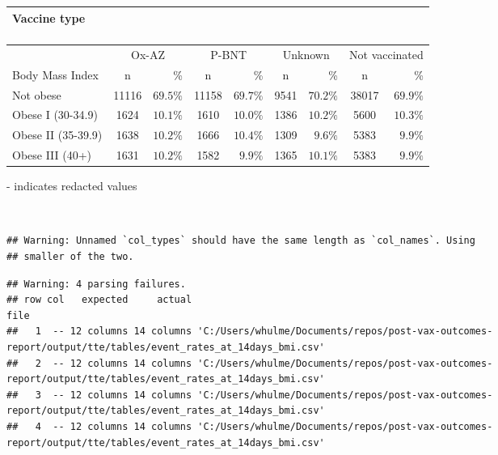 \documentclass[
]{article}
\begin{document}
\captionsetup[table]{labelformat=empty,skip=1pt}
\begin{longtable}{lcrcrcrcr}
\caption*{
\large Vaccine type\\ 
\small \\ 
} \\ 
\toprule
& \multicolumn{2}{c}{Ox-AZ} & \multicolumn{2}{c}{P-BNT} & \multicolumn{2}{c}{Unknown} & \multicolumn{2}{c}{Not vaccinated} \\ 
 \cmidrule(lr){2-3}\cmidrule(lr){4-5}\cmidrule(lr){6-7}\cmidrule(lr){8-9}
Body Mass Index & n & \% & n & \% & n & \% & n & \% \\ 
\midrule
Not obese & 11116 & $69.5\%$ & 11158 & $69.7\%$ & 9541 & $70.2\%$ & 38017 & $69.9\%$ \\ 
Obese I (30-34.9) & 1624 & $10.1\%$ & 1610 & $10.0\%$ & 1386 & $10.2\%$ & 5600 & $10.3\%$ \\ 
Obese II (35-39.9) & 1638 & $10.2\%$ & 1666 & $10.4\%$ & 1309 & $9.6\%$ & 5383 & $9.9\%$ \\ 
Obese III (40+) & 1631 & $10.2\%$ & 1582 & $9.9\%$ & 1365 & $10.1\%$ & 5383 & $9.9\%$ \\ 
\bottomrule
\end{longtable}
\begin{minipage}{\linewidth}
- indicates redacted values\\ 
\end{minipage}

~ ~

\begin{verbatim}
## Warning: Unnamed `col_types` should have the same length as `col_names`. Using
## smaller of the two.
\end{verbatim}

\begin{verbatim}
## Warning: 4 parsing failures.
## row col   expected     actual                                                                                                       file
##   1  -- 12 columns 14 columns 'C:/Users/whulme/Documents/repos/post-vax-outcomes-report/output/tte/tables/event_rates_at_14days_bmi.csv'
##   2  -- 12 columns 14 columns 'C:/Users/whulme/Documents/repos/post-vax-outcomes-report/output/tte/tables/event_rates_at_14days_bmi.csv'
##   3  -- 12 columns 14 columns 'C:/Users/whulme/Documents/repos/post-vax-outcomes-report/output/tte/tables/event_rates_at_14days_bmi.csv'
##   4  -- 12 columns 14 columns 'C:/Users/whulme/Documents/repos/post-vax-outcomes-report/output/tte/tables/event_rates_at_14days_bmi.csv'
\end{verbatim}
\end{document}
